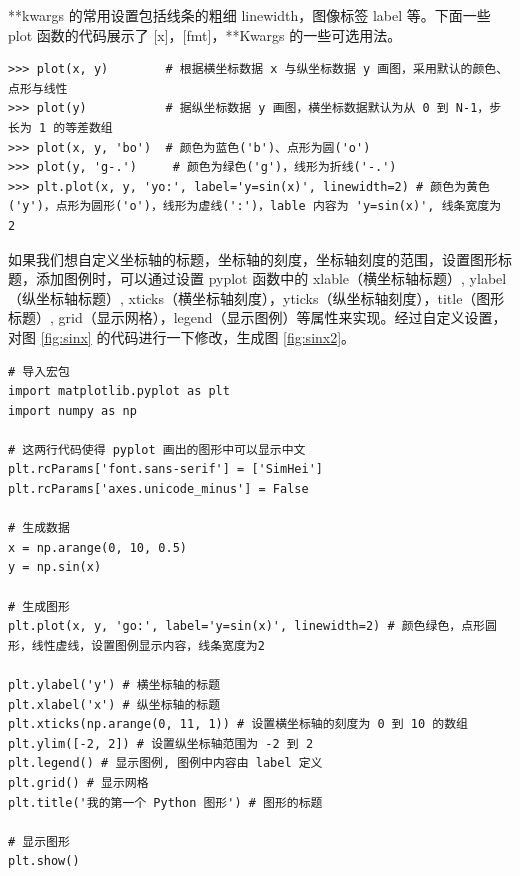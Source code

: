 **kwargs 的常用设置包括线条的粗细 linewidth，图像标签  label 等。下面一些 plot 函数的代码展示了 [x]，[fmt]，**Kwargs 的一些可选用法。

\clearpage

\begin{lstlisting}[Language= Python]
>>> plot(x, y)        # 根据横坐标数据 x 与纵坐标数据 y 画图，采用默认的颜色、点形与线性
>>> plot(y)           # 据纵坐标数据 y 画图，横坐标数据默认为从 0 到 N-1，步长为 1 的等差数组
>>> plot(x, y, 'bo')  # 颜色为蓝色('b')、点形为圆('o')
>>> plot(y, 'g-.')     # 颜色为绿色('g')，线形为折线('-.')
>>> plt.plot(x, y, 'yo:', label='y=sin(x)', linewidth=2) # 颜色为黄色('y')，点形为圆形('o')，线形为虚线(':')，lable 内容为 'y=sin(x)', 线条宽度为 2
\end{lstlisting}


如果我们想自定义坐标轴的标题，坐标轴的刻度，坐标轴刻度的范围，设置图形标题，添加图例时，可以通过设置 pyplot 函数中的 xlable（横坐标轴标题）, ylabel（纵坐标轴标题）, xticks（横坐标轴刻度），yticks（纵坐标轴刻度），title（图形标题）, grid（显示网格），legend（显示图例）等属性来实现。经过自定义设置，对图 \ref{fig:sinx} 的代码进行一下修改，生成图 \ref{fig:sinx2}。


\begin{lstlisting}[Language = Python]
# 导入宏包
import matplotlib.pyplot as plt
import numpy as np

# 这两行代码使得 pyplot 画出的图形中可以显示中文
plt.rcParams['font.sans-serif'] = ['SimHei']
plt.rcParams['axes.unicode_minus'] = False

# 生成数据
x = np.arange(0, 10, 0.5)
y = np.sin(x)

# 生成图形
plt.plot(x, y, 'go:', label='y=sin(x)', linewidth=2) # 颜色绿色，点形圆形，线性虚线，设置图例显示内容，线条宽度为2

plt.ylabel('y') # 横坐标轴的标题
plt.xlabel('x') # 纵坐标轴的标题
plt.xticks(np.arange(0, 11, 1)) # 设置横坐标轴的刻度为 0 到 10 的数组
plt.ylim([-2, 2]) # 设置纵坐标轴范围为 -2 到 2
plt.legend() # 显示图例, 图例中内容由 label 定义
plt.grid() # 显示网格
plt.title('我的第一个 Python 图形') # 图形的标题

# 显示图形
plt.show()

\end{lstlisting}

